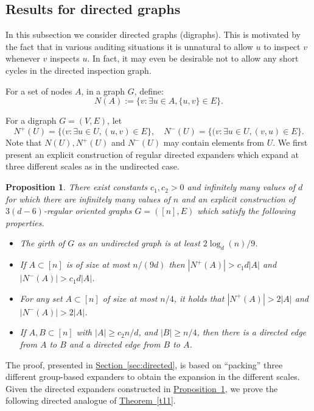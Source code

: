 \documentclass[11pt]{article}
\numberwithin{equation}{section}
\newtheorem{proposition}[theorem]{Proposition}
\theoremstyle{definition}
\theoremstyle{plain}
\newcommand{\expref}[2]{\hyperref[#2]{#1~\ref{#2}}}
\begin{document}
\subsection{Results for directed graphs}
In this subsection we consider directed graphs (digraphs). 
This is motivated by the fact
that in various auditing situations it is 
unnatural to allow $u$ to inspect $v$ whenever 
$v$ inspects $u$. In fact, it may even be desirable not to allow any short cycles in the directed inspection graph. 

%

%

%
For a set of nodes $A$, in a graph $G$, define:
\begin{equation} \label{def:na}
N(A) := \{ v : \exists u \in A, \{u,v\} \in E \}.
\end{equation}

For a digraph $G=(V,E)$, let 
\[
N^{+}(U) = \{ (v : \exists u \in U, (u,v) \in E\}, \quad 
N^{-}(U) = \{ (v : \exists u \in U, (v,u) \in E\}.
\]
Note that $N(U), N^{+}(U)$ and $N^{-}(U)$ may contain elements from $U$. 
We first present an explicit construction of regular directed 
expanders which expand at three 
different scales as in the undirected case. 

%
\begin{proposition}
\label{p14} 
There
%
exist constants $c_1,c_2 > 0$ 
and  infinitely many values of 
$d$ for which there are infinitely many values of $n$ and an 
explicit construction of $3(d-6)$-regular oriented
%
graphs $G=([n],E)$ which satisfy
%
the following properties.
%
\begin{itemize}
\item The girth of $G$ as an undirected graph is at least $2 \log_{d}(n) / 9$. 
\item If $A \subset [n]$ is of size at most $n/(9 d)$ then $|N^{+}(A)| > c_1 d |A|$ and $|N^{-}(A)| > c_1 d |A|$. 
\item For any set $A \subset [n]$ of size at most $n/4$, it holds that $|N^{+}(A)| > 2 |A|$ and $|N^{-}(A)| > 2|A|$. 
\item If $A,B \subset [n]$ with $|A| \geq c_2 n /d$, and
  $|B| \geq n/4$, then there is a directed edge from $A$ to $B$ and a
  directed edge from $B$ to $A$.
\end{itemize} 
\end{proposition} 

%

The proof, presented in \expref{Section}{sec:directed}, is based 
on ``packing'' three different group-based expanders 
to obtain the expansion in the different scales.  Given 
the directed expanders constructed in \expref{Proposition}{p14}, we prove the following directed analogue of \expref{Theorem}{t11}.
\end{document}
